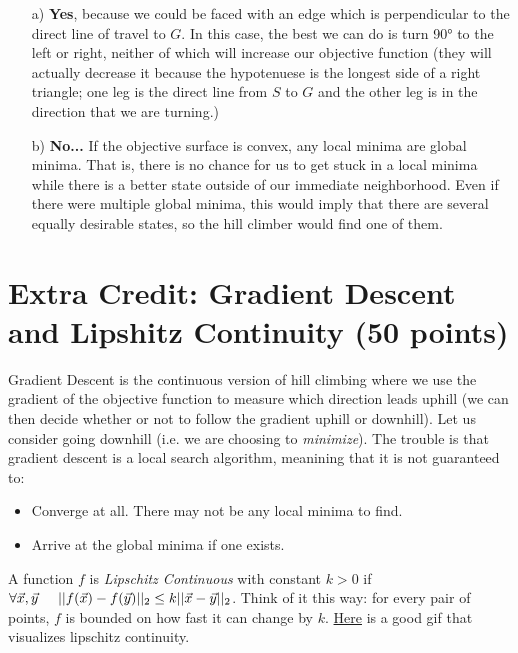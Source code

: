 \documentclass[11pt]{article}
\newcommand{\question}[1]{\section*{\normalsize #1}}
\begin{document}
\begin{enumerate}
	\item[a)] \textbf{Yes}, because we could be faced with an edge which is perpendicular to the direct line of travel to $G$. In this case, the best we can do is turn 90° to the left or right, neither of which will increase our objective function (they will actually decrease it because the hypotenuese is the longest side of a right triangle; one leg is the direct line from $S$ to $G$ and the other leg is in the direction that we are turning.)
	\item[b)] \textbf{No...} If the objective surface is convex, any local minima are global minima. That is, there is no chance for us to get stuck in a local minima while there is a better state outside of our immediate neighborhood. Even if there were multiple global minima, this would imply that there are several equally desirable states, so the hill climber would find one of them.
	
\end{enumerate}

\newpage


\question{Extra Credit: Gradient Descent and Lipshitz Continuity (50 points)}
Gradient Descent is the continuous version of hill climbing where we use the gradient of the objective function to measure which direction leads uphill (we can then decide whether or not to follow the gradient uphill or downhill). Let us consider going downhill (i.e. we are choosing to \textit{minimize}). The trouble is that gradient descent is a local search algorithm, meanining that it is not guaranteed to:
\begin{itemize}
    \item Converge at all. There may not be any local minima to find.
    \item Arrive at the global minima if one exists.
\end{itemize}

\noindent A function $f$ is \textit{Lipschitz Continuous} with constant $k>0$ if $\forall \vec{x},\vec{y} \hspace{.5cm}||f(\vec{x})-f(\vec{y})||_2\le k||\vec{x}-\vec{y}||_2$. Think of it this way: for every pair of points, $f$ is bounded on how fast it can change by $k$. \href{https://en.wikipedia.org/wiki/Lipschitz_continuity}{Here} is a good gif that visualizes lipschitz continuity.\newline
\end{document}
